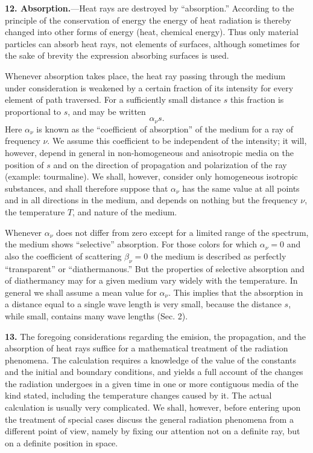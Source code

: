 \documentclass[12pt,oneside]{book}
\begin{document}
\textbf{12. Absorption.}---Heat rays are destroyed by ``absorption.'' According to the principle of the conservation of energy the energy of heat radiation is thereby changed into other forms of energy (heat, chemical energy). Thus only material particles can absorb heat rays, not elements of surfaces, although sometimes for the sake of brevity the expression absorbing surfaces is used. \par 

Whenever absorption takes place, the heat ray passing through the medium under consideration is weakened by a certain fraction of its intensity for every element of path traversed. For a sufficiently small distance $s$ this fraction is proportional to $s$, and may be written
\begin{equation}
    \alpha_\nu s.
    \label{eq4}
\end{equation}
Here $\alpha_\nu$ is known as the ``coefficient of absorption'' of the medium for a ray of frequency $\nu$. We assume this coefficient to be independent of the intensity; it will, however, depend in general in non-homogeneous and anisotropic media on the position of $s$ and on the direction of propagation and polarization of the ray (example: tourmaline). We shall, however, consider only homogeneous isotropic substances, and shall therefore suppose that $\alpha_\nu$ has the same value at all points and in all directions in the medium, and depends on nothing but the frequency $\nu$, the temperature $T$, and nature of the medium. \par 

Whenever $\alpha_\nu$ does not differ from zero except for a limited range of the spectrum, the medium shows ``selective'' absorption. For those colors for which $\alpha_\nu=0$ and also the coefficient of scattering $\beta_\nu=0$ the medium is described as perfectly ``transparent'' or ``diathermanous.'' But the properties of selective absorption and of diathermancy may for a given medium vary widely with the temperature. In general we shall assume a mean value for $\alpha_\nu$. This implies that the absorption in a distance equal to a single wave length is very small, because the distance $s$, while small, contains many wave lengths (Sec. 2). \par 

\textbf{13.} The foregoing considerations regarding the emision, the propagation, and the absorption of heat rays suffice for a mathematical treatment of the radiation phenomena. The calculation requires a knowledge of the value of the constants and the initial and boundary conditions, and yields a full account of the changes the radiation undergoes in a given time in one or more contiguous media of the kind stated, including the temperature changes caused by it. The actual calculation is usually very complicated. We shall, however, before entering upon the treatment of special cases discuss the general radiation phenomena from a different point of view, namely by fixing our attention not on a definite ray, but on a definite position in space. \par 
\end{document}
